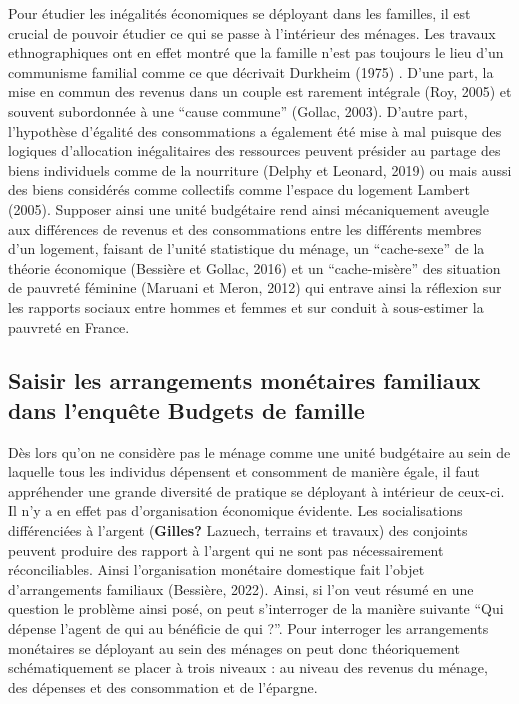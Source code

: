 \documentclass[
  12pt,
]{book}
\begin{document}
Pour étudier les inégalités économiques se déployant dans les familles,
il est crucial de pouvoir étudier ce qui se passe à l'intérieur des
ménages. Les travaux ethnographiques ont en effet montré que la famille
n'est pas toujours le lieu d'un communisme familial comme ce que
décrivait Durkheim (1975) . D'une part, la mise en commun des revenus
dans un couple est rarement intégrale (Roy, 2005) et souvent subordonnée
à une ``cause commune'' (Gollac, 2003). D'autre part, l'hypothèse
d'égalité des consommations a également été mise à mal puisque des
logiques d'allocation inégalitaires des ressources peuvent présider au
partage des biens individuels comme de la nourriture (Delphy et Leonard,
2019) ou mais aussi des biens considérés comme collectifs comme l'espace
du logement Lambert (2005). Supposer ainsi une unité budgétaire rend
ainsi mécaniquement aveugle aux différences de revenus et des
consommations entre les différents membres d'un logement, faisant de
l'unité statistique du ménage, un ``cache-sexe'' de la théorie
économique (Bessière et Gollac, 2016) et un ``cache-misère'' des
situation de pauvreté féminine (Maruani et Meron, 2012) qui entrave
ainsi la réflexion sur les rapports sociaux entre hommes et femmes et
sur conduit à sous-estimer la pauvreté en France.

\subsection{Saisir les arrangements monétaires familiaux dans l'enquête
Budgets de
famille}\label{saisir-les-arrangements-monuxe9taires-familiaux-dans-lenquuxeate-budgets-de-famille}

Dès lors qu'on ne considère pas le ménage comme une unité budgétaire au
sein de laquelle tous les individus dépensent et consomment de manière
égale, il faut appréhender une grande diversité de pratique se déployant
à intérieur de ceux-ci. Il n'y a en effet pas d'organisation économique
évidente. Les socialisations différenciées à l'argent (\textbf{Gilles?}
Lazuech, terrains et travaux) des conjoints peuvent produire des rapport
à l'argent qui ne sont pas nécessairement réconciliables. Ainsi
l'organisation monétaire domestique fait l'objet d'arrangements
familiaux (Bessière, 2022). Ainsi, si l'on veut résumé en une question
le problème ainsi posé, on peut s'interroger de la manière suivante
``Qui dépense l'agent de qui au bénéficie de qui ?''. Pour interroger
les arrangements monétaires se déployant au sein des ménages on peut
donc théoriquement schématiquement se placer à trois niveaux : au niveau
des revenus du ménage, des dépenses et des consommation et de l'épargne.
\end{document}
